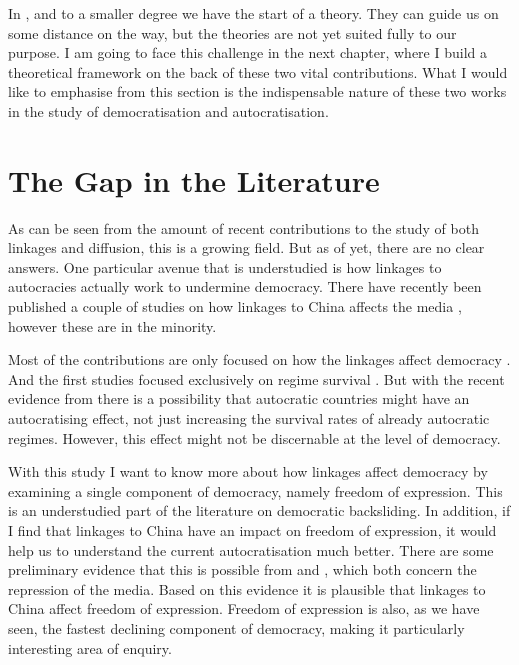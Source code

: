 In \citet{tansey_ties_2017}, and to a smaller degree \citet{levitsky_linkage_2006} we have the start of a theory. They can guide us on some distance on the way, but the theories are not yet suited fully to our purpose. I am going to face this challenge in the next chapter, where I build a theoretical framework on the back of these two vital contributions. What I would like to emphasise from this section is the indispensable nature of these two works in the study of democratisation and autocratisation. 

\section{The Gap in the Literature}
As can be seen from the amount of recent contributions to the study of both linkages and diffusion, this is a growing field. But as of yet, there are no clear answers. One particular avenue that is understudied is how linkages to autocracies actually work to undermine democracy. There have recently been published a couple of studies on how linkages to China affects the media \citep{gamso_is_2021, toettoe_foreign_2023}, however these are in the minority.

Most of the contributions are only focused on how the linkages affect democracy \citep{bader_china_2015, levitsky_linkage_2006, risse_democracy_2015, tansey_ties_2017, weyland_autocratic_2017}. And the first studies focused exclusively on regime survival \citep{bader_china_2015, tansey_ties_2017}. But with the recent evidence from \citep{gamso_is_2021, toettoe_foreign_2023} there is a possibility that autocratic countries might have an autocratising effect, not just increasing the survival rates of already autocratic regimes. However, this effect might not be discernable at the level of democracy. 

With this study I want to know more about how linkages affect democracy by examining a single component of democracy, namely freedom of expression. This is an understudied part of the literature on democratic backsliding. In addition, if I find that linkages to China have an impact on freedom of expression, it would help us to understand the current autocratisation much better. There are some preliminary evidence that this is possible from \citet{gamso_is_2021} and \citet{toettoe_foreign_2023}, which both concern the repression of the media. Based on this evidence it is plausible that linkages to China affect freedom of expression. Freedom of expression is also, as we have seen, the fastest declining component of democracy, making it particularly interesting area of enquiry. 

